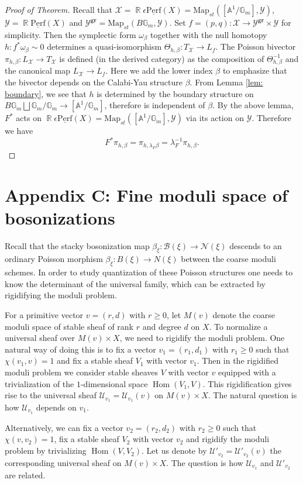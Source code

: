 \documentclass[reqno]{amsart}
\DeclareMathOperator\R{\mathbb R}
\theoremstyle{definition}
\theoremstyle{remark}
\newcommand{\G}{{\mathbb G}}
\newcommand{\A}{{\mathbb A}}
\newcommand{\ul}{\underline}
\newcommand{\Hom}{\operatorname{Hom}}
\newcommand{\eps}{\epsilon}
\newcommand{\uperf}{\ul{\mathrm{Perf}}}
\newcommand{\gr}{\mathbf{gr}}
\newcommand{\cU}{\mathcal{U}}
\newcommand{\Map}{{\mathrm{Map}}}
\newcommand{\sX}{\mathscr{X}}
\newcommand{\sB}{\mathscr{B}}
\newcommand{\sY}{\mathscr{Y}}
\newcommand{\sN}{\mathscr{N}}
\newcommand{\am}{\overrightarrow{m}}
\newcommand{\amu}{\overrightarrow{\mu}}
\numberwithin{equation}{section}
\begin{document}
\begin{proof}[Proof of Theorem] 
Recall that  $\sX=\R\eps\uperf(X)=\Map_{st}([\A^1/\G_m], \sY)$, $\sY=\R\uperf(X)$ and $\sY^\gr=\Map_{st}(B\G_m,\sY)$. Set $f=(p,q): \sX\to \sY^\gr\times \sY$ for simplicity. Then the symplectic form $\omega_\beta$ together with the null homotopy $h: f^*\omega_\beta \sim 0$ determines a quasi-isomorphism $\Theta_{h,\beta}: T_\sX\to L_f$. The Poisson bivector $\pi_{h,\beta}: L_{\sX}\to T_\sX$ is defined (in the derived category) as the composition of $\Theta_{h,\beta}^{-1}$ and the canonical map $L_\sX\to L_f$. Here we add the lower index $\beta$ to emphasize that the bivector depends on the Calabi-Yau structure $\beta$. From Lemma \ref{lem: boundary}, we see that $h$ is determined by the boundary structure on $B\G_m\bigsqcup \G_m\big/\G_m\to [\A^1\big/\G_m]$, therefore is independent of $\beta$.
By the above lemma, $F^*$ acts on  $\R\eps\uperf(X)=\Map_{st}([\A^1\big/ \G_m],\sY)$ via its action on $\sY$. Therefore we have
\[
F^*\pi_{h,\beta}=\pi_{h,\lambda_F\beta}=\lambda_F^{-1} \pi_{h,\beta}.
\]
\end{proof}

\section*{Appendix C: Fine moduli space of bosonizations}
Recall that the stacky bosonization map $\beta_\xi:\sB(\xi)\to \sN(\xi)$ descends to an ordinary Poisson morphism $\beta_\xi: B(\xi)\to N(\xi)$ between the coarse moduli schemes. In order to study quantization of these Poisson structures one needs to know the determinant of the universal family, which can be extracted by rigidifying the moduli problem.

For a primitive vector $v=(r,d)$ with $r\geq 0$, let $M(v)$ denote the coarse moduli space of stable sheaf of rank $r$ and degree $d$ on $X$.
To normalize a universal sheaf over $M(v)\times X$, we need to rigidify the moduli problem.
One natural way of doing this is to fix a vector $v_1=(r_1,d_1)$ with $r_1\geq 0$ such that $\chi(v_1,v)=1$ and fix a stable sheaf $V_1$ with vector $v_1$.
Then in the rigidified moduli problem we consider stable sheaves $V$ with vector $v$ equipped with a trivialization of the $1$-dimensional space $\Hom(V_1,V)$.
This rigidification gives rise to the universal sheaf $\cU_{v_1}=\cU_{v_1}(v)$ on $M(v)\times X$.
The natural question is how $\cU_{v_1}$ depends on $v_1$.

Alternatively, we can fix a vector $v_2=(r_2,d_2)$ with $r_2\geq 0$ such that $\chi(v,v_2)=1$, fix a stable sheaf $V_2$ with vector $v_2$ and rigidify the moduli problem
by trivializing $\Hom(V,V_2)$. Let us denote by $\cU'_{v_2}=\cU'_{v_2}(v)$ the corresponding universal sheaf on $M(v)\times X$. 
The question is how $\cU_{v_1}$ and $\cU'_{v_2}$ are related. 
\end{document}

